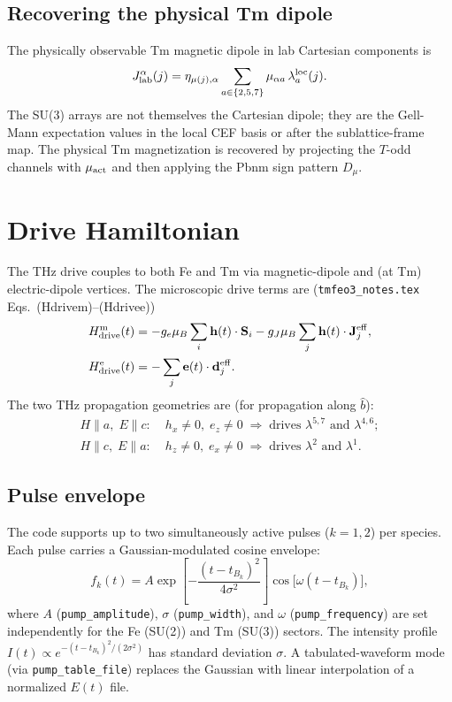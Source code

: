 \documentclass[11pt]{article}
\newcommand{\bS}{\mathbf{S}}
\newcommand{\bh}{\mathbf{h}}
\newcommand{\be}{\mathbf{e}}
\newcommand{\Jeff}{\mathbf{J}^{\rm eff}}
\newcommand{\deff}{\mathbf{d}^{\rm eff}}
\begin{document}
\subsection{Recovering the physical Tm dipole}

The physically observable Tm magnetic dipole in lab Cartesian
components is
\begin{equation}
J^\alpha_{\rm lab}(j) = \eta_{\mu(j),\alpha}\sum_{a\in\{2,5,7\}}
\mu_{\alpha a}\,\lambda_a^{\rm loc}(j).
\end{equation}
The SU(3) arrays are not themselves the Cartesian dipole; they are
the Gell-Mann expectation values in the local CEF basis or after the
sublattice-frame map.  The physical Tm magnetization is recovered by
projecting the $T$-odd channels with $\mu_{\rm act}$ and then applying
the Pbnm sign pattern $D_\mu$.

\section{Drive Hamiltonian}
\label{sec:drive}

The THz drive couples to both Fe and Tm via magnetic-dipole and
(at Tm) electric-dipole vertices.  The microscopic drive terms are
(\texttt{tmfeo3\_notes.tex} Eqs.~(Hdrivem)--(Hdrivee))
\begin{align}
H_{\rm drive}^{\rm m}(t) &= -g_e\mu_B\sum_{i}\bh(t)\cdot\bS_i
- g_J\mu_B\sum_{j}\bh(t)\cdot\Jeff_j, \label{eq:Hdm}\\
H_{\rm drive}^{\rm e}(t) &= -\sum_{j}\be(t)\cdot\deff_j. \label{eq:Hde}
\end{align}
The two THz propagation geometries are (for propagation along $\hat b$):
\begin{equation}
\begin{aligned}
H\!\parallel\! a,\; E\!\parallel\! c:\;&
h_x\neq 0,\; e_z\neq 0
\;\Rightarrow\;\text{drives }\lambda^{5,7}\text{ and }\lambda^{4,6};\\
H\!\parallel\! c,\; E\!\parallel\! a:\;&
h_z\neq 0,\; e_x\neq 0
\;\Rightarrow\;\text{drives }\lambda^2\text{ and }\lambda^1.
\end{aligned}
\end{equation}

\subsection{Pulse envelope}

The code supports up to two simultaneously active pulses ($k = 1, 2$)
per species.  Each pulse carries a Gaussian-modulated cosine envelope:
\begin{equation}
f_k(t) =
A\exp\!\left[-\frac{(t-t_{B_k})^2}{4\sigma^2}\right]
\cos\!\bigl[\omega(t-t_{B_k})\bigr],
\end{equation}
where $A$ (\texttt{pump\_amplitude}), $\sigma$ (\texttt{pump\_width}),
and $\omega$ (\texttt{pump\_frequency}) are set independently for the
Fe (SU(2)) and Tm (SU(3)) sectors.  The intensity profile
$I(t)\propto e^{-(t-t_{B_k})^2/(2\sigma^2)}$ has standard deviation
$\sigma$.  A tabulated-waveform mode (via \texttt{pump\_table\_file})
replaces the Gaussian with linear interpolation of a normalized
$E(t)$ file.
\end{document}
